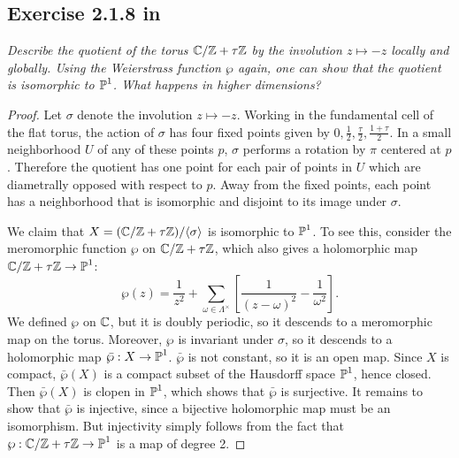 \documentclass{article}
\begin{document}
\subsection*{Exercise 2.1.8 in \cite{Huy}}
\emph{Describe the quotient of the torus $\mathbb{C}/\mathbb{Z} + \tau \mathbb{Z}$ by the involution $z \mapsto -z$ locally and
globally. Using the Weierstrass function $\wp$ again, one can show that the quotient is isomorphic to $\operatorname{\mathbb{P}}^1$.
What happens in higher dimensions?}
\begin{proof}
Let $\sigma$ denote the involution $z\mapsto -z$. Working in the fundamental cell of the flat torus, the
action of $\sigma$ has four fixed points given by $0, \frac{1}{2}, \frac{\tau}{2}, \frac{1+\tau}{2}$. In
a small neighborhood $U$ of any of these points $p$, $\sigma$ performs a rotation by $\pi$ centered at $p$. 
Therefore the quotient has one point for each pair of points in $U$ which are diametrally opposed with respect
to $p$. Away from the fixed points, each point has a neighborhood that is isomorphic and disjoint to its
image under $\sigma$.

We claim that $X = (\mathbb{C} / \mathbb{Z} + \tau \mathbb{Z}) / \langle \sigma \rangle$ is isomorphic to $\operatorname{\mathbb{P}}^1$. To see this, consider
the meromorphic function $\wp$ on $\mathbb{C} / \mathbb{Z} + \tau \mathbb{Z}$, which also gives a holomorphic map $\mathbb{C} / \mathbb{Z} + \tau \mathbb{Z} 
\to \operatorname{\mathbb{P}}^1$:
\[	\wp(z) = \frac{1}{z^2} + \sum_{\omega \in \Lambda^{\times}} \left[ \frac{1}{(z - \omega)^2} 
- \frac{1}{\omega^2}\right].	\]
We defined $\wp$ on $\mathbb{C}$, but it is doubly periodic, so it descends to a meromorphic map on the torus.
Moreover, $\wp$ is invariant under $\sigma$, so it descends to a holomorphic map $\bar \wp: X \to \operatorname{\mathbb{P}}^1$. $\bar \wp$ is 
not constant, so it is an open map. Since $X$ is compact, $\bar \wp(X)$ is a compact subset of the Hausdorff space
$\operatorname{\mathbb{P}}^1$, hence closed. Then $\bar \wp(X)$ is clopen in $\operatorname{\mathbb{P}}^1$, which shows that $\bar \wp$ is surjective. It
remains to show that $\bar \wp$ is injective, since a bijective holomorphic map must be an isomorphism. But injectivity
simply follows from the fact that $\wp :\mathbb{C} / \mathbb{Z} + \tau \mathbb{Z} \to \operatorname{\mathbb{P}}^1$ is a map of degree 2.
\end{proof}
\end{document}

